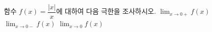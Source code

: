 함수 $f(x)=\dfrac{|x|}{x}$에 대하여 다음 극한을 조사하시오.
 $\displaystyle\lim_{x\to 0+}f(x)$
 $\displaystyle\lim_{x\to 0-}f(x)$
 $\displaystyle\lim_{x\to 0}f(x)$
